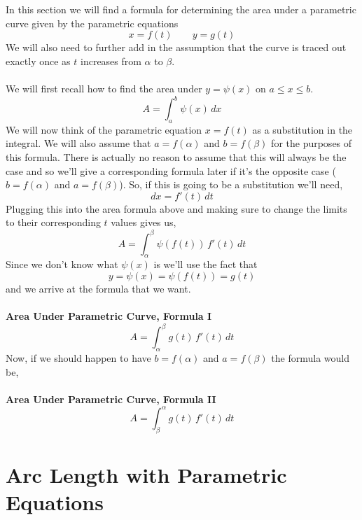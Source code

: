 \documentclass[10pt,reqno]{book}
\theoremstyle{definition}
\begin{document}
	In this section we will find a formula for determining the area under a parametric curve given by the parametric equations
	\[ x = f(t) \qquad y = g(t) \]
	We will also need to further add in the assumption that the curve is traced out exactly once as $ t $ increases from $ \alpha $ to $ \beta $.\\ \\
	We will first recall how to find the area under $ y = \psi(x) $ on $ a \leq x \leq b $.
	\[ A = \int_a^b \psi(x)\,dx \]
	We will now think of the parametric equation $ x = f(t) $ as a substitution in the integral. We will also assume that $ a = f(\alpha) $ and $ b = f(\beta) $ for the purposes of this formula.  There is actually no reason to assume that this will always be the case and so we'll give a corresponding formula later if it's the opposite case ($ b = f(\alpha) $ and $ a = f(\beta) $). So, if this is going to be a substitution we'll need,
	\[ dx = f'(t)\,dt \]
	Plugging this into the area formula above and making sure to change the limits to their corresponding $ t $ values gives us,
	\[ A = \int_{\alpha}^{\beta} \psi(f(t))\,f'(t)\,dt \]
	Since we don't know what $ \psi(x) $ is we'll use the fact that
	\[ y = \psi(x) = \psi(f(t)) = g(t) \]
	and we arrive at the formula that we want.\\ \\
	\textbf{Area Under Parametric Curve, Formula I}\\
	\[ A = \int_{\alpha}^{\beta} g(t)\,f'(t)\,dt \]
	Now, if we should happen to have $ b = f(\alpha) $ and $ a = f(\beta) $ the formula would be,\\ \\
	\textbf{Area Under Parametric Curve, Formula II}\\
	\[ A = \int_{\beta}^{\alpha} g(t)\,f'(t)\,dt \]
	
	\section{Arc Length with Parametric Equations}
	
\end{document}

